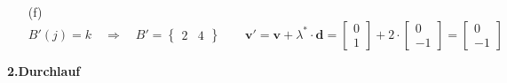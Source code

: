 \begin{itemize}
	\item[(f)] $B'(j)=k\quad\Rightarrow\quad B'=\begin{Bmatrix}2&4\end{Bmatrix}\qquad \mathbf{v'}=\mathbf{v}+\lambda^*\cdot \mathbf{d}=\begin{bmatrix}0\\1\end{bmatrix}+2\cdot\begin{bmatrix}0\\-1\end{bmatrix}=\begin{bmatrix}0\\-1\end{bmatrix}$
\end{itemize}

\vspace{0.5cm}
\textbf{2.Durchlauf}
